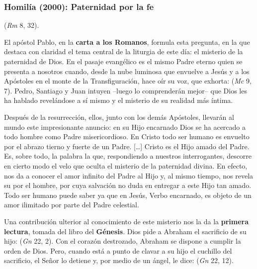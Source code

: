\label{b2-03-02-1997A}
\newpage 

\subsubsection{Homilía (2000): Paternidad por la fe}


\begin{body}
  (\textit{Rm} 8, 32).

El apóstol Pablo, en la \textbf{carta a los Romanos}, formula esta pregunta, en la que destaca con claridad el tema central de la liturgia de este día: el misterio de la paternidad de Dios. En el pasaje evangélico es el mismo Padre eterno quien se presenta a nosotros cuando, desde la nube luminosa que envuelve a Jesús y a los Apóstoles en el monte de la Transfiguración, hace oír su voz, que exhorta:  (\textit{Mc} 9, 7). Pedro, Santiago y Juan intuyen –luego lo comprenderán mejor– que Dios les ha hablado revelándose a sí mismo y el misterio de su realidad más íntima.

Después de la resurrección, ellos, junto con los demás Apóstoles, llevarán al mundo este impresionante anuncio: en su Hijo encarnado Dios se ha acercado a todo hombre como Padre misericordioso. En Cristo todo ser humano es envuelto por el abrazo tierno y fuerte de un Padre. [\ldots] Cristo es el Hijo amado del Padre. Es, sobre todo, la palabra  la que, respondiendo a nuestros interrogantes, descorre en cierto modo el velo que oculta el misterio de la paternidad divina. En efecto, nos da a conocer el amor infinito del Padre al Hijo y, al mismo tiempo, nos revela su  por el hombre, por cuya salvación no duda en entregar a este Hijo tan amado. Todo ser humano puede saber ya que en Jesús, Verbo encarnado, es objeto de un amor ilimitado por parte del Padre celestial.

Una contribución ulterior al conocimiento de este misterio nos la da la \textbf{primera lectura}, tomada del libro del \textbf{Génesis}. Dios pide a Abraham el sacrificio de su hijo:  (\textit{Gn} 22, 2). Con el corazón destrozado, Abraham se dispone a cumplir la orden de Dios. Pero, cuando está a punto de clavar a su hijo el cuchillo del sacrificio, el Señor lo detiene y, por medio de un ángel, le dice:  (\textit{Gn} 22, 12).


\end{body}

